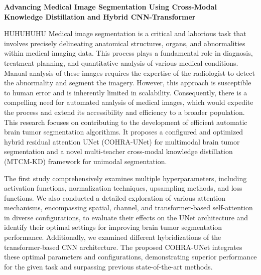 \newcommand{\thesisTitleEnglish}{Advancing Medical Image Segmentation Using Cross-Modal Knowledge Distillation and Hybrid CNN-Transformer}

{\centering \Large \bf \thesisTitleEnglish \par} \vspace{1.0cm}

HUHUHUHU  Medical image segmentation is a critical and laborious task that involves precisely delineating anatomical structures, organs, and abnormalities within medical imaging data. This process plays a fundamental role in diagnosis, treatment planning, and quantitative analysis of various medical conditions. Manual analysis of these images requires the expertise of the radiologist to detect the abnormality and segment the imagery. However, this approach is susceptible to human error and is inherently limited in scalability. Consequently, there is a compelling need for automated analysis of medical images, which would expedite the process and extend its accessibility and efficiency to a broader population. This research focuses on contributing to the development of efficient automatic brain tumor segmentation algorithms. It proposes a configured and optimized hybrid residual attention UNet (COHRA-UNet) for multimodal brain tumor segmentation and a novel multi-teacher cross-modal knowledge distillation (MTCM-KD) framework for unimodal segmentation. 

The first study comprehensively examines multiple hyperparameters, including activation functions, normalization techniques, upsampling methods, and loss functions. We also conducted a detailed exploration of various attention mechanisms, encompassing spatial, channel, and transformer-based self-attention in diverse configurations, to evaluate their effects on the UNet architecture and identify their optimal settings for improving brain tumor segmentation performance. Additionally, we examined different hybridizations of the transformer-based CNN architecture. The proposed COHRA-UNet integrates these optimal parameters and configurations, demonstrating superior performance for the given task and surpassing previous state-of-the-art methods.

